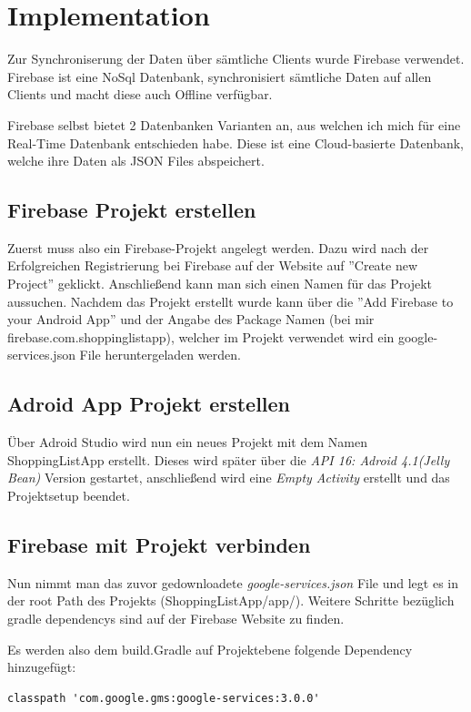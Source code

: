 \section{Implementation}
\label{sec:Ergebnisse}
Zur Synchroniserung der Daten über sämtliche Clients wurde Firebase verwendet. Firebase ist eine NoSql Datenbank, synchronisiert sämtliche Daten auf allen Clients und macht diese auch Offline verfügbar. 

Firebase selbst bietet 2 Datenbanken Varianten an, aus welchen ich mich für eine Real-Time Datenbank entschieden habe. Diese ist eine Cloud-basierte Datenbank, welche ihre Daten als JSON Files abspeichert.

\subsection{Firebase Projekt erstellen}
Zuerst muss also ein Firebase-Projekt angelegt werden. Dazu wird nach der Erfolgreichen Registrierung bei Firebase auf der Website auf ''Create new Project'' geklickt. 
Anschließend kann man sich einen Namen für das Projekt aussuchen. Nachdem das Projekt erstellt wurde kann über die ''Add Firebase to your Android App'' und der Angabe des Package Namen (bei mir firebase.com.shoppinglistapp), welcher im Projekt verwendet wird ein google-services.json File heruntergeladen werden.

\subsection{Adroid App Projekt erstellen}
Über Adroid Studio wird nun ein neues Projekt mit dem Namen ShoppingListApp erstellt.
Dieses wird später über die \textit{API 16: Adroid 4.1(Jelly Bean)} Version gestartet, anschließend wird eine \textit{Empty Activity} erstellt und das Projektsetup beendet. 

\subsection{Firebase mit Projekt verbinden}
Nun nimmt man das zuvor gedownloadete \textit{google-services.json} File und legt es in der root Path des Projekts (ShoppingListApp/app/). Weitere Schritte bezüglich gradle dependencys sind auf der Firebase Website zu finden. 

Es werden also dem build.Gradle auf Projektebene folgende Dependency hinzugefügt:

\begin{lstlisting}
classpath 'com.google.gms:google-services:3.0.0'
\end{lstlisting}

